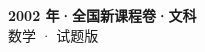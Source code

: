 \documentclass[zihao=-4, a4paper]{ctexart}
\begin{document}
\begin{center}
  {\Large\bfseries 2002 年·全国新课程卷·文科}\\[4pt]
  {\large 数学 · 试题版}
\end{center}
\medskip
{}

\end{document}
